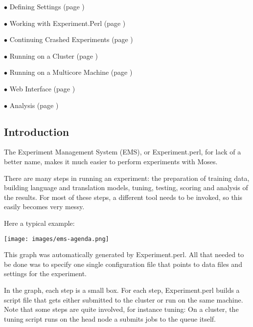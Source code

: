       {\bf $\bullet$} Defining Settings (page \pageref{experiment-perl.texntoc19}) 

      {\bf $\bullet$} Working with Experiment.Perl (page \pageref{experiment-perl.texntoc20}) 

      {\bf $\bullet$} Continuing Crashed Experiments (page \pageref{experiment-perl.texntoc21}) 

      {\bf $\bullet$} Running on a Cluster (page \pageref{experiment-perl.texntoc22}) 

      {\bf $\bullet$} Running on a Multicore Machine (page \pageref{experiment-perl.texntoc23}) 

      {\bf $\bullet$} Web Interface (page \pageref{experiment-perl.texntoc24}) 

      {\bf $\bullet$} Analysis (page \pageref{experiment-perl.texntoc25})






\subsection{
\label{experiment-perl.texntoc1}Introduction}


The Experiment Management System (EMS), or Experiment.perl, for lack of a better name, makes it much easier to perform experiments with Moses.



There are many steps in running an experiment: the preparation of training data, building language and translation models, tuning, testing, scoring and analysis of the results. For most of these steps, a different tool needs to be invoked, so this easily becomes very messy.



Here a typical example:









\begin{center}
\texttt{[image: images/ems-agenda.png]}
\end{center}




This graph was automatically generated by Experiment.perl. All that needed to be done was to specify one single configuration file that points to data files and settings for the experiment.



In the graph, each step is a small box. For each step, Experiment.perl builds a script file that gets either submitted to the cluster or run on the same machine. Note that some steps are quite involved, for instance tuning: On a cluster, the tuning script runs on the head node a submits jobs to the queue itself.



